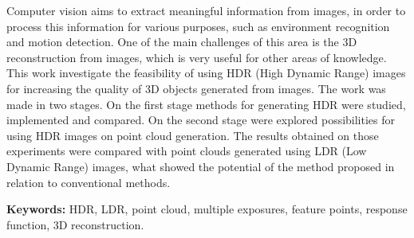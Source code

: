 Computer vision aims to extract meaningful information from images, in order to process this information for various purposes, such as environment recognition and motion detection. One of the main challenges of this area is the 3D reconstruction from images, which is very useful for other areas of knowledge. This work investigate the feasibility of using HDR (High Dynamic Range) images for increasing the quality of 3D objects generated from images. The work was made in two stages. On the first stage methods for generating HDR were studied, implemented and compared. On the second stage were explored possibilities for using HDR images on point cloud generation. The results obtained on those experiments were compared with point clouds generated using LDR (Low Dynamic Range) images, what showed the potential of the method proposed in relation to conventional methods.

\textbf{Keywords:} HDR, LDR, point cloud, multiple exposures, feature points, response function, 3D reconstruction. 